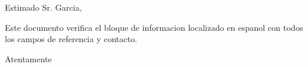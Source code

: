 \documentclass[basic, infoblock, lang=spanish]{../../onlinebrief24}
\begin{document}
\begin{letter}{}
\opening{Estimado Sr. Garcia,}

Este documento verifica el bloque de informacion localizado en espanol
con todos los campos de referencia y contacto.

\closing{Atentamente}
\end{letter}
\end{document}
